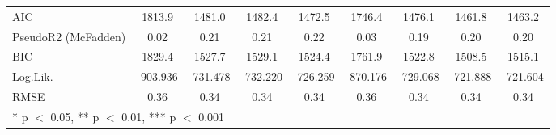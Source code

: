 \begin{table}
\begin{tabular}[t]{lcccccccc}
AIC & 1813.9 & 1481.0 & 1482.4 & 1472.5 & 1746.4 & 1476.1 & 1461.8 & 1463.2\\
PseudoR2 (McFadden) & 0.02 & 0.21 & 0.21 & 0.22 & 0.03 & 0.19 & 0.20 & 0.20\\
BIC & 1829.4 & 1527.7 & 1529.1 & 1524.4 & 1761.9 & 1522.8 & 1508.5 & 1515.1\\
Log.Lik. & -903.936 & -731.478 & -732.220 & -726.259 & -870.176 & -729.068 & -721.888 & -721.604\\
RMSE & 0.36 & 0.34 & 0.34 & 0.34 & 0.36 & 0.34 & 0.34 & 0.34\\
\bottomrule
\multicolumn{9}{l}{\rule{0pt}{1em}* p $<$ 0.05, ** p $<$ 0.01, *** p $<$ 0.001}\\
\end{tabular}
\end{table}
